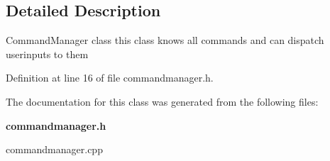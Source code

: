 \subsection{Detailed Description}
Command\-Manager class this class knows all commands and can dispatch userinputs to them 

Definition at line 16 of file commandmanager.\-h.



The documentation for this class was generated from the following files\-:\begin{DoxyCompactItemize}
\item 
{\bf commandmanager.\-h}\item 
commandmanager.\-cpp\end{DoxyCompactItemize}
